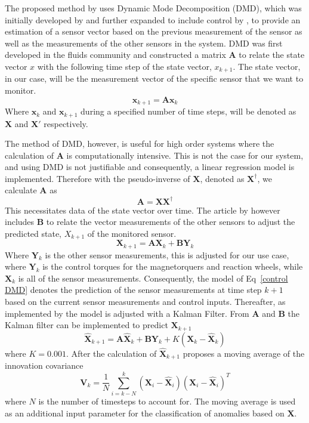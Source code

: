 \documentclass[letterpaper, 10 pt, conference]{ieeeconf}  %
\begin{document}
The proposed method by \textcite{DeSilva2020} uses Dynamic Mode Decomposition (DMD), which was initially developed by \textcite{schmid2011applications} and further expanded to include control by \textcite{proctor2016dynamic}, to provide an estimation of a sensor vector based on the previous measurement of the sensor as well as the measurements of the other sensors in the system. DMD was first developed in the fluids community and constructed a matrix $\mathbf{A}$ to relate the state vector $x$ with the following time step of the state vector, $x_{k+1}$. The state vector, in our case, will be the measurement vector of the specific sensor that we want to monitor.
\begin{equation}
\mathbf{x}_{k+1} = \mathbf{Ax}_k
\end{equation}
Where $\mathbf{x}_k$ and $\mathbf{x}_{k+1}$ during a specified number of time steps, will be denoted as $\mathbf{X}$ and $\mathbf{X'}$ respectively.

The method of DMD, however, is useful for high order systems where the calculation of $\mathbf{A}$ is computationally intensive. This is not the case for our system, and using DMD is not justifiable and consequently, a linear regression model is implemented. Therefore with the pseudo-inverse of $\mathbf{X}$, denoted as $\mathbf{X^{\dagger}}$, we calculate $\mathbf{A}$ as
\begin{equation}
\mathbf{A} = \mathbf{X}\mathbf{X^{\dagger}}
\end{equation}
This necessitates data of the state vector over time. The article by \textcite{DeSilva2020} however includes $\mathbf{B}$ to relate the vector measurements of the other sensors to adjust the predicted state, $X_{k+1}$ of the monitored sensor. 
\begin{equation}
\mathbf{X}_{k+1} = \mathbf{AX}_k + \mathbf{BY}_k
\label{control DMD}
\end{equation}
Where $\mathbf{Y}_k$ is the other sensor measurements, this is adjusted for our use case, where $\mathbf{Y}_k$ is the control torques for the magnetorquers and reaction wheels, while $\mathbf{X}_k$ is all of the sensor measurements. Consequently, the model of Eq~\ref{control DMD} denotes the prediction of the sensor measurements at time step $k+1$ based on the current sensor measurements and control inputs.
Thereafter, as implemented by \textcite{DeSilva2020} the model is adjusted with a Kalman Filter. From $\mathbf{A}$ and $\mathbf{B}$ the Kalman filter can be implemented to predict $\mathbf{X}_{k+1}$
\begin{equation}
\hat{\mathbf{X}}_{k+1} = \mathbf{A}\hat{\mathbf{X}}_k + \mathbf{B}\mathbf{Y}_k + K(\mathbf{X}_k - \hat{\mathbf{X}}_k)
\end{equation}
where $K = 0.001$. After the calculation of $\hat{\mathbf{X}}_{k+1}$ \textcite{DeSilva2020} proposes a moving average of the innovation covariance
\begin{equation}
\mathbf{V}_k = \frac{1}{N} \sum_{i=k-N}^k (\mathbf{X}_i - \hat{\mathbf{X}}_i)(\mathbf{X}_i - \hat{\mathbf{X}}_i)^T
\end{equation}
where $N$ is the number of timesteps to account for. The moving average is used as an additional input parameter for the classification of anomalies based on $\mathbf{X}$.
\end{document}
